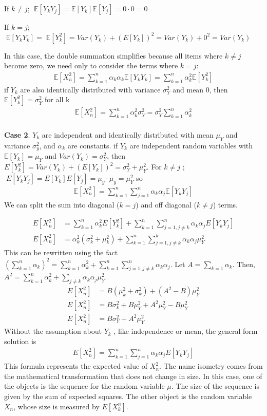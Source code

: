 If $k \ne  j$;  $\;\mathbb{E}[Y_kY_j]= \mathbb{E}[Y_k]\mathbb{E}[Y_j]=0\cdot 0=0$

If $k = j$;  $\;\mathbb{E}[Y_kY_k] = \;\mathbb{E}[Y_k^2] = Var(Y_k) + (E[Y_k])^2 = Var(Y_k) + 0^2=Var(Y_k)$

In this case, the double summation simplifies because all items where $k \ne j$ become zero, we need only to consider the terms where $k=j$:
\begin{align*}
\mathbb{E}[X_n^2]=\sum_{k=1}^n\alpha_k\alpha_k \mathbb{E}[Y_kY_k] = \sum_{k=1}^n \alpha_k^2  \mathbb{E}[Y_k^2]
\end{align*}
if $Y_k$ are also identically distributed with variance $\sigma_Y^2$ and mean 0, then $\mathbb{E}[Y_k^2]=\sigma_Y^2$ for all k
\begin{align*}
\mathbb{E}[X_n^2]=\sum_{k=1}^n\alpha_k^2 \sigma_Y^2 = \sigma_Y^2 \sum_{k=1}^n\alpha_k^2
\end{align*}
\\
\textbf{Case 2}. $Y_k$ are independent and identically distributed with mean $\mu_Y$ and variance $\sigma_y^2$, and $\alpha_k$ are constants.
if $Y_k$ are independent random variables with $\mathbb{E}[Y_k]=\mu_Y$ and $Var(Y_k)=\sigma_Y^2$, then $E[Y_k^2]=Var(Y_k) + (E[Y_k])^2 = \sigma_Y^2 +\mu_Y^2$.
For $k \ne j$ ; $\;E[Y_kY_j] = E[Y_k]E[Y_j] = \mu_y \cdot \mu_y = \mu_Y^2$
so
\begin{align*}
\mathbb{E}[X_n^2]=\sum_{k=1}^n\sum_{j=1}^n \alpha_k  \alpha_j \mathbb{E}[Y_kY_j]
\end{align*}
We can split the sum into diagonal ($k=j$) and off diagonal ($k\ne j$)  terms.

\begin{align*}
E[X_n^2] &= \sum_{k=1}^n \alpha_k^2 E[Y_k^2]+ \sum_{k=1}^n\sum_{j=1,j\ne k}^n \alpha_k\alpha_jE[Y_kY_j]\\
E[X_n^2] &= \alpha_k^2(\sigma_k^2 + \mu_k^2) + \sum_{k=1}^n\sum_{j=1, j\ne k}^k \alpha_k\alpha_j \mu_Y^2
\end{align*}
This can be rewritten using the fact $(\sum_{k=1}^n\alpha_k)^2 = \sum_{k=1}^n\alpha_k^2 + \sum_{k=1}^n \sum_{j=1,j \ne k}^n \alpha_k\alpha_j$.  Let $A=\sum_{k=1}\alpha_k$. Then, $A^2=\sum_{k=1}^n \alpha_k^2 + \sum_{j\ne k} \alpha_k \alpha_j\mu_Y^2$.
\begin{align*}
E[X_n^2] &=  B(\mu_k^2 + \sigma_k^2) + (A^2-B)\mu_Y^2\\
E[X_n^2] &= B\sigma_k^2 + B\mu_Y^2 + A^2\mu_Y^2 - B\mu_Y^2\\
E[X_n^2] &= B\sigma_Y^2 + A^2\mu_Y^2
\end{align*}
Without the assumption about $Y_k$ , like independence or mean, the general form solution is
\begin{align*}
E[X_n^2]=\sum_{k=1}^n\sum_{j=1}^n \alpha_k\alpha_j E[Y_kY_j]
\end{align*}
This formula represents the expected value of $X_n^2$. The name isometry comes from the mathematical transformation that does not change in size. In this case, one of the objects is the sequence for the random variable $\mu$. The size of the sequence is given by the sum of expected squares. The other object is the random variable $X_n$, whose size is measured by $E[X_k^n]$.

